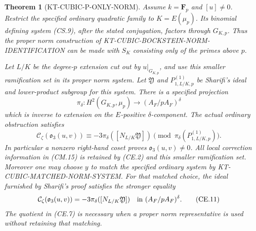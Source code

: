\documentclass[11pt,a4paper]{article}
\newtheorem{theorem}{Theorem}[section]
\theoremstyle{definition}
\begin{document}
\begin{theorem}[KT-CUBIC-P-ONLY-NORM]
Assume \(k=\mathbf F_p\) and \([u]\ne0\).  Restrict the specified
ordinary quadratic family to \(K=E(\mu_p)\).
Its binomial defining system (CS.9), after the stated conjugation,
factors through \(G_{K,p}\).  Thus the proper norm construction
of KT-CUBIC-BOCKSTEIN-NORM-IDENTIFICATION can be made with
\(S_K\) consisting only of the primes above \(p\).

Let \(L/K\) be the degree-\(p\) extension cut out by \(u|_{G_{K,p}}\),
and use this smaller ramification set in its proper norm system.
Let \(\mathfrak Y\) and \(P^{(1)}_{1,L/K,p}\) be Sharifi's
ideal and lower-product subgroup for this system.  There is a
specified projection
\[
 \pi_\delta:H^2(G_{K,p},\mu_p)
           \longrightarrow (A_F/pA_F)^\delta
                                                        \tag{CE.6}
\]
which is inverse to extension on the \(E\)-positive
\(\delta\)-component.  The actual ordinary obstruction satisfies
\[
 \mathcal C_\zeta(\mathfrak o_3(u,v))
 \equiv -3\pi_\delta([N_{L/K}\mathfrak Y])
          \pmod{\pi_\delta(P^{(1)}_{1,L/K,p})}.
                                                        \tag{CE.7}
\]
In particular a nonzero right-hand coset proves
\(\mathfrak o_3(u,v)\ne0\).  All local correction information
in (CM.15) is retained by (CE.2) and this smaller ramification
set.  Moreover one may choose \(y\) to match the specified
ordinary system by KT-CUBIC-MATCHED-NORM-SYSTEM.  For that
matched choice, the ideal furnished by Sharifi's proof satisfies
the stronger equality
\[
 \mathcal C_\zeta(\mathfrak o_3(u,v))
            =-3\pi_\delta([N_{L/K}\mathfrak Y])
       \quad\hbox{in }(A_F/pA_F)^\delta .
                                                       \tag{CE.11}
\]
The quotient in (CE.7) is necessary when a proper norm
representative is used without retaining that matching.
\end{theorem}
\end{document}
